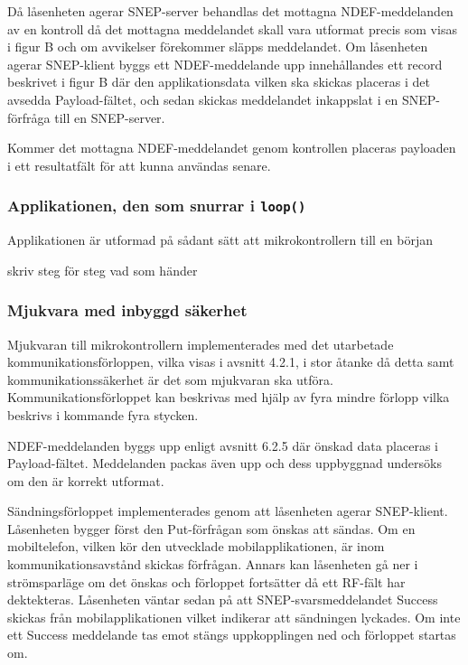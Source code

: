 \documentclass[11pt]{article}
\begin{document}

Då låsenheten agerar SNEP-server behandlas det mottagna NDEF-meddelanden av en kontroll då det mottagna meddelandet skall vara utformat precis som visas i figur B och om avvikelser förekommer släpps meddelandet. Om låsenheten agerar SNEP-klient byggs ett NDEF-meddelande upp innehållandes ett record beskrivet i figur B där den applikationsdata vilken ska skickas placeras i det avsedda Payload-fältet, och sedan skickas meddelandet inkappslat i en SNEP-förfråga till en SNEP-server.

Kommer det mottagna NDEF-meddelandet genom kontrollen placeras payloaden i ett resultatfält för att kunna användas senare. 

\subsubsection{Applikationen, den som snurrar i \texttt{loop()}}
Applikationen är utformad på sådant sätt att mikrokontrollern till en början 

skriv steg för steg vad som händer

\subsubsection{Mjukvara med inbyggd säkerhet}
Mjukvaran till mikrokontrollern implementerades med det utarbetade kommunikationsförloppen, vilka visas i avsnitt 4.2.1, i stor åtanke då detta samt kommunikationssäkerhet är det som mjukvaran ska utföra. Kommunikationsförloppet kan beskrivas med hjälp av fyra mindre förlopp vilka beskrivs i kommande fyra stycken.

NDEF-meddelanden byggs upp enligt avsnitt 6.2.5 där önskad data placeras i Payload-fältet. Meddelanden packas även upp och dess uppbyggnad undersöks om den är korrekt utformat.

Sändningsförloppet implementerades genom att låsenheten agerar SNEP-klient. Låsenheten bygger först den  Put-förfrågan som önskas att sändas. Om en mobiltelefon, vilken kör den utvecklade mobilapplikationen, är inom kommunikationsavstånd skickas förfrågan. Annars kan låsenheten gå ner i strömsparläge om det önskas och förloppet fortsätter då ett RF-fält har dektekteras. Låsenheten väntar sedan på att SNEP-svarsmeddelandet Success skickas från mobilapplikationen vilket indikerar att sändningen lyckades. Om inte ett Success meddelande tas emot stängs uppkopplingen ned och förloppet startas om.
\end{document}

